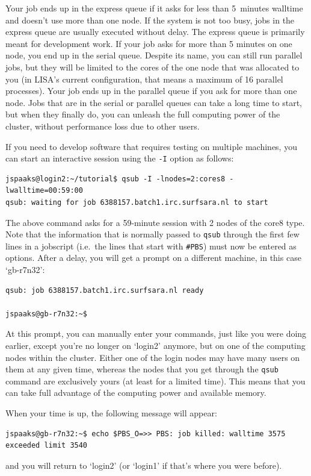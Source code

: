 {Your job ends up in the express queue if it asks for less than 5~minutes walltime and doesn't use more than one node. If the system is not too busy, jobs in the express queue are usually executed without delay. The express queue is primarily meant for development work. If your job asks for more than 5 minutes on one node, you end up in the serial queue. Despite its name, you can still run parallel jobs, but they will be limited to the cores of the one node that was allocated to you (in LISA's current configuration, that means a maximum of 16 parallel processes). Your job ends up in the parallel queue if you ask for more than one node. Jobs that are in the serial or parallel queues can take a long time to start, but when they finally do, you can unleash the full computing power of the cluster, without performance loss due to other users.


If you need to develop software that requires testing on multiple machines, you can start an interactive session using the \lstinline[style=bashinline]{-I} option as follows:
\begin{lstlisting}[style=basic,style=bash]
jspaaks@login2:~/tutorial$ qsub -I -lnodes=2:cores8 -lwalltime=00:59:00
qsub: waiting for job 6388157.batch1.irc.surfsara.nl to start
\end{lstlisting}
The above command asks for a 59-minute session with 2 nodes of the core8 type. Note that the information that is normally passed to \lstinline[style=bashinline]{qsub} through the first few lines in a jobscript (i.e.~the lines that start with \texttt{\#PBS}) must now be entered as options. After a delay, you will get a prompt on a different machine, in this case `gb-r7n32':

\begin{lstlisting}[style=basic,style=bash]
qsub: job 6388157.batch1.irc.surfsara.nl ready

jspaaks@gb-r7n32:~$
\end{lstlisting}
At this prompt, you can manually enter your commands, just like you were doing earlier, except you're no longer on `login2' anymore, but on one of the computing nodes within the cluster. Either one of the login nodes may have many users on them at any given time, whereas the nodes that you get through the \texttt{qsub} command are exclusively yours (at least for a limited time). This means that you can take full advantage of the computing power and available memory.

When your time is up, the following message will appear:
\begin{lstlisting}[style=basic,style=bash]
jspaaks@gb-r7n32:~$ echo $PBS_O=>> PBS: job killed: walltime 3575 exceeded limit 3540
\end{lstlisting}
and you will return to `login2' (or `login1' if that's where you were before).

}
